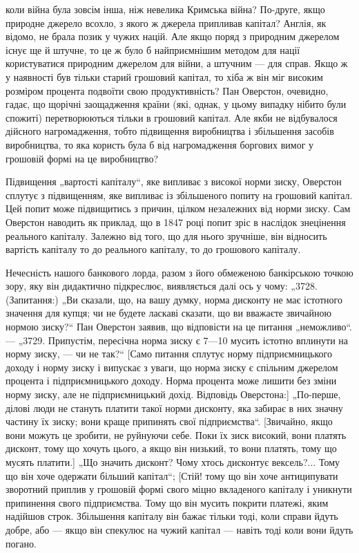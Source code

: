 коли війна була зовсім інша, ніж невелика Кримська війна? По-друге, якщо природне джерело всохло, з
якого ж джерела припливав капітал? Англія, як відомо, не брала позик у чужих націй.
Але якщо поряд з природним джерелом існує ще й штучне, то
це ж було б найприємнішим методом для нації користуватися
природним джерелом для війни, а штучним — для справ. Якщо ж
у наявності був тільки старий грошовий капітал, то хіба ж
він міг високим розміром процента подвоїти свою продуктивність?
Пан Оверстон, очевидно, гадає, що щорічні заощадження країни
(які, однак, у цьому випадку нібито були спожиті) перетворюються тільки в грошовий капітал. Але якби
не відбувалося
дійсного нагромадження, тобто підвищення виробництва і збільшення засобів виробництва, то яка
користь була б від нагромадження боргових вимог у грошовій формі на це виробництво?

Підвищення „вартості капіталу“, яке випливає з високої
норми зиску, Оверстон сплутує з підвищенням, яке випливає
із збільшеного попиту на грошовий капітал. Цей попит може
підвищитись з причин, цілком незалежних від норми зиску. Сам
Оверстон наводить як приклад, що в 1847 році попит зріс в наслідок знецінення реального капіталу.
Залежно від того, що для
нього зручніше, він відносить вартість капіталу то до реального
капіталу, то до грошового капіталу.

Нечесність нашого банкового лорда, разом з його обмеженою
банкірською точкою зору, яку він дидактично підкреслює, виявляється далі ось у чому: „3728.
(Запитання:) „Ви сказали, що,
на вашу думку, норма дисконту не має істотного значення для
купця; чи не будете ласкаві сказати, що ви вважаєте звичайною нормою зиску?“ Пан Оверстон заявив, що
відповісти на це
питання „неможливо“. — „3729. Припустім, пересічна норма
зиску є 7—10%
мусить істотно вплинути на норму зиску, — чи не так?“ [Само
питання сплутує норму підприємницького доходу і норму зиску
і випускає з уваги, що норма зиску є спільним джерелом процента
і підприємницького доходу. Норма процента може лишити без
зміни норму зиску, але не підприємницький дохід. Відповідь Оверстона:] „По-перше, ділові люди не
стануть платити такої норми
дисконту, яка забирає в них значну частину їх зиску; вони краще
припинять свої підприємства“. [Звичайно, якщо вони можуть це
зробити, не руйнуючи себе. Поки їх зиск високий, вони платять
дисконт, тому що хочуть цього, а якщо він низький, то вони платять,
тому що мусять платити.] „Що значить дисконт? Чому хтось
дисконтує вексель?... Тому що він хоче одержати більший капітал“; [Стій! тому що він хоче
антиципувати зворотний приплив у грошовій формі свого міцно вкладеного капіталу і
уникнути припинення свого підприємства. Тому що він мусить
покрити платежі, яким надійшов строк. Збільшення капіталу він
бажає тільки тоді, коли справи йдуть добре, або — якщо він спекулює на чужий капітал — навіть тоді
коли вони йдуть погано.
